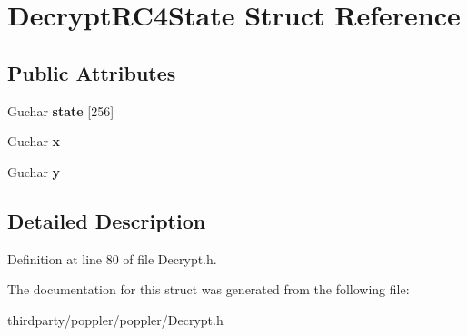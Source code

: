 \hypertarget{struct_decrypt_r_c4_state}{}\section{Decrypt\+R\+C4\+State Struct Reference}
\label{struct_decrypt_r_c4_state}
\subsection*{Public Attributes}
\begin{DoxyCompactItemize}
\item 
\mbox{\label{struct_decrypt_r_c4_state_a4f7094f218e284b14c3a13b1a9a010ba}} 
Guchar {\bfseries state} \mbox{[}256\mbox{]}
\item 
\mbox{\label{struct_decrypt_r_c4_state_a7cf1501e2c35df8a77ca8f2415af13cc}} 
Guchar {\bfseries x}
\item 
\mbox{\label{struct_decrypt_r_c4_state_a78ac4404673a49af16f265a151c2a2b8}} 
Guchar {\bfseries y}
\end{DoxyCompactItemize}


\subsection{Detailed Description}


Definition at line 80 of file Decrypt.\+h.



The documentation for this struct was generated from the following file\+:\begin{DoxyCompactItemize}
\item 
thirdparty/poppler/poppler/Decrypt.\+h\end{DoxyCompactItemize}
